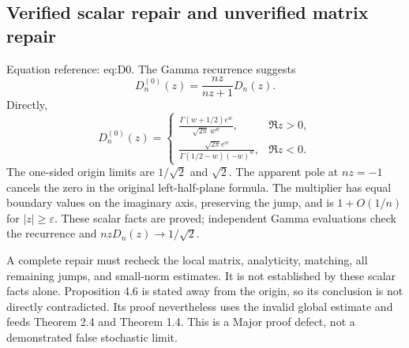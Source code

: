 \documentclass[10pt]{article}
\begin{document}
\subsection*{Verified scalar repair and unverified matrix repair}
Equation reference: eq:D0. The Gamma recurrence suggests \[
 D_n^{(0)}(z)=\frac{nz}{nz+1}D_n(z).\] Directly, \[D_n^{(0)}(z)=
 \begin{cases}
 \displaystyle\frac{\Gamma(w+1/2)e^w}{\sqrt{2\pi}\,w^w},
       &\Re z>0,\\[6pt]
 \displaystyle\frac{\sqrt{2\pi}e^w}
 {\Gamma(1/2-w)(-w)^w},&\Re z<0 .
 \end{cases}\] The one-sided origin limits are \(1/\sqrt2\) and \(\sqrt2\). The apparent pole at \(nz=-1\) cancels the zero in the original left-half-plane formula. The multiplier has equal boundary values on the imaginary axis, preserving the jump, and is \(1+O(1/n)\) for \(|z|\ge\varepsilon\). These scalar facts are proved; independent Gamma evaluations check the recurrence and \(nzD_n(z)\to1/\sqrt2\).\par
A complete repair must recheck the local matrix, analyticity, matching, all remaining jumps, and small-norm estimates. It is not established by these scalar facts alone. Proposition 4.6 is stated away from the origin, so its conclusion is not directly contradicted. Its proof nevertheless uses the invalid global estimate and feeds Theorem 2.4 and Theorem 1.4. This is a Major proof defect, not a demonstrated false stochastic limit.\par
\end{document}

